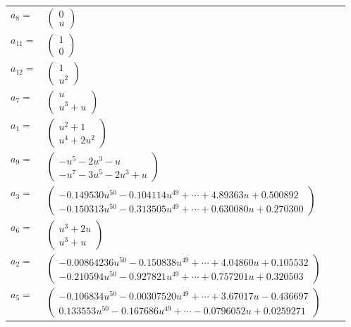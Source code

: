 \documentclass[1p]{elsarticle_modified}
\theoremstyle{definition}
\begin{document}
\begin{tabular}{m{7pt} m{180pt} m{7pt} m{180pt} }
\flushright $a_{8}=$&$\begin{pmatrix}0\\u\end{pmatrix}$ \\
\flushright $a_{11}=$&$\begin{pmatrix}1\\0\end{pmatrix}$ \\
\flushright $a_{12}=$&$\begin{pmatrix}1\\u^2\end{pmatrix}$ \\
\flushright $a_{7}=$&$\begin{pmatrix}u\\u^3+u\end{pmatrix}$ \\
\flushright $a_{1}=$&$\begin{pmatrix}u^2+1\\u^4+2 u^2\end{pmatrix}$ \\
\flushright $a_{9}=$&$\begin{pmatrix}- u^5-2 u^3- u\\- u^7-3 u^5-2 u^3+u\end{pmatrix}$ \\
\flushright $a_{3}=$&$\begin{pmatrix}-0.149530 u^{50}-0.104114 u^{49}+\cdots+4.89363 u+0.500892\\-0.150313 u^{50}-0.313505 u^{49}+\cdots+0.630080 u+0.270300\end{pmatrix}$ \\
\flushright $a_{6}=$&$\begin{pmatrix}u^3+2 u\\u^3+u\end{pmatrix}$ \\
\flushright $a_{2}=$&$\begin{pmatrix}-0.00864236 u^{50}-0.150838 u^{49}+\cdots+4.04860 u+0.105532\\-0.210594 u^{50}-0.927821 u^{49}+\cdots+0.757201 u+0.320503\end{pmatrix}$ \\
\flushright $a_{5}=$&$\begin{pmatrix}-0.106834 u^{50}-0.00307520 u^{49}+\cdots+3.67017 u-0.436697\\0.133553 u^{50}-0.167686 u^{49}+\cdots-0.0796052 u+0.0259271\end{pmatrix}$ \\

\end{tabular}
\end{document}
